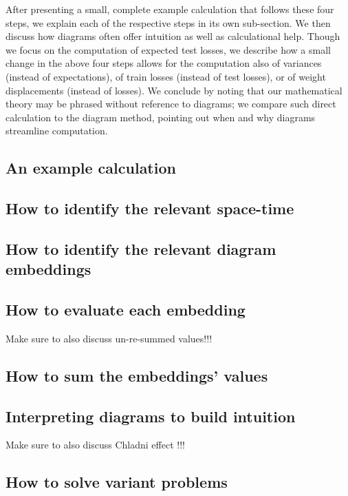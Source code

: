\documentclass{article}
\theoremstyle{plain}
\theoremstyle{definition}
\begin{document}
    After presenting a small, complete example calculation that follows these
    four steps, we explain each of the respective steps in its own sub-section.
    We then discuss how diagrams often offer intuition as well as calculational
    help.  Though we focus on the computation of expected test losses, we
    describe how a small change in the above four steps allows for the
    computation also of variances (instead of expectations), of train losses
    (instead of test losses), or of weight displacements (instead of losses).
    We conclude by noting that our mathematical theory may be phrased without
    reference to diagrams; we compare such direct calculation to the diagram
    method, pointing out when and why diagrams streamline computation.

    \subsection{An example calculation}                             \label{appendix:example}
    \subsection{How to identify the relevant space-time}            \label{appendix:draw-spacetime}
    \subsection{How to identify the relevant diagram embeddings}    \label{appendix:draw-embeddings}
    \subsection{How to evaluate each embedding}                     \label{appendix:evaluate-embeddings}
        Make sure to also discuss un-re-summed values!!!
    \subsection{How to sum the embeddings' values}                  \label{appendix:sum-embeddings}
    \subsection{Interpreting diagrams to build intuition}           \label{appendix:interpret-diagrams}
        Make sure to also discuss Chladni effect \cite{ch87}!!!
    \subsection{How to solve variant problems}                      \label{appendix:solve-variants}
\end{document}
